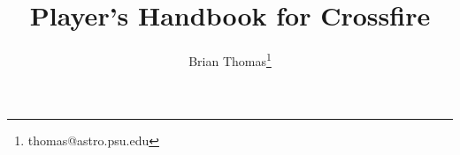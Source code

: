 \documentclass[12pt, a4paper]{report}
\title{Player's Handbook for Crossfire}
\author{Brian Thomas\footnote{thomas@astro.psu.edu}}
\begin{document}
\pagestyle{plain}
\renewcommand{\thepage}{\roman{page}}



\snglsp

\tableofcontents
\listoftables

\pagebreak

\sloppy
\setcounter{page}{1}
\renewcommand{\thepage}{\arabic{page}}









\appendix






% 
\end{document}
